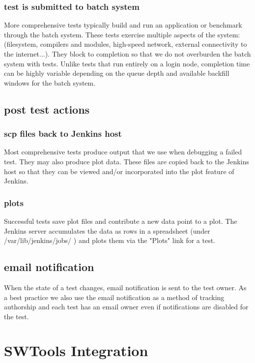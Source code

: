 \documentclass[10pt, conference, compsocconf]{IEEEtran}
\begin{document}
\subsubsection{test is submitted to batch system}
More comprehensive tests typically build and run an application or benchmark through the batch system.  These tests exercise multiple aspects of the system: (filesystem, compilers and modules, high-speed network, external connectivity to the internet...).  They block to completion so that we do not overburden the batch system with tests.  Unlike tests that run entirely on a login node, completion time can be highly variable depending on the queue depth and available backfill windows for the batch system.
\subsection{post test actions}
\subsubsection{scp files back to Jenkins host}
Most comprehensive tests produce output that we use when debugging a failed test.  They may also produce plot data.  These files are copied back to the Jenkins host so that they can be viewed and/or incorporated into the plot feature of Jenkins.
\subsubsection{plots}
Successful tests save plot files and contribute a new data point to a plot.  The Jenkins server accumulates the data as rows in a spreadsheet (under /var/lib/jenkins/jobs/ ) and plots them via the "Plots" link for a test.
\subsection{email notification}
When the state of a test changes, email notification is sent to the test owner.  As a best practice we also use the email notification as a method of tracking authorship and each test has an email owner even if notifications are disabled for the test.


\section{SWTools Integration}
\label{sec:SWToolsIntegration}
\end{document}
